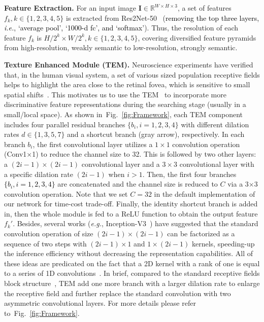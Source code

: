 \documentclass[10pt,journal,compsoc]{IEEEtran}
\def\ie{\emph{i.e.}}
\def\eg{\emph{e.g.}}
\newcommand{\myPara}[1]{\vspace{6pt}\noindent\textbf{#1}\qquad }
\newcommand{\figref}[1]{Fig.~\ref{#1}}
\newcommand{\Rev}[1]{\textcolor{black}{#1}}
\begin{document}
\myPara{Feature Extraction.}
%
For an input image $\mathbf{I}\!\in\!\mathbb{R}^{W\!\times\! H \!\times\!3}$, 
a set of features $f_k, k \in \{ 1,2,3,4,5 \}$ is extracted from 
Res2Net-50~\cite{gao2019res2net} (\Rev{removing the top three layers, \ie, `average pool', `1000-d fc', and `softmax'}).
%
Thus, the resolution of each feature 
$f_k$ is ${H/2^k \times W/2^k}, k \in \{ 1,2,3,4,5 \}$, 
covering diversified feature pyramids from high-resolution, 
weakly semantic to low-resolution, strongly semantic.

\myPara{Texture Enhanced Module (TEM).}
%
Neuroscience experiments have verified that, in the human visual system, 
a set of various sized population receptive fields helps to 
highlight the area close to the retinal fovea, 
which is sensitive to small spatial shifts~\cite{liu2018receptive}.
%
This motivates us to use the TEM~\cite{wu2019cascaded} to incorporate 
more discriminative feature representations during the searching stage 
(usually in a small/local space).
%
As shown in~\figref{fig:Framework}, each TEM component includes four parallel 
residual branches $\{b_i, i = 1,2,3,4\}$ with different dilation rates 
$d \in \{1,3,5,7\}$ and a shortcut branch (gray arrow), respectively.
%
In each branch $b_i$, the first convolutional layer utilizes a $1\times 1$ 
convolution operation (Conv1$\times$1) to reduce the channel size to 32.
%
This is followed by two other layers: 
a $(2i-1)\times(2i-1)$ convolutional layer and a $3\times 3$ 
convolutional layer with a specific dilation rate $(2i-1)$ when $i>1$.
%
Then, the first four branches \Rev{$\{ b_i, i=1, 2, 3, 4 \}$} are concatenated and 
the channel size is reduced to $C$ via a 3$\times$3 convolution operation.
%
Note that we set $C=32$ in the default implementation of our network 
for time-cost trade-off.
%
Finally, the identity shortcut branch is added in, then the whole module 
is fed to a ReLU function to obtain the output feature $f_k'$.
%
Besides, several works (\eg, Inception-V3~\cite{szegedy2016rethinking}) 
have suggested that the standard convolution operation of size 
$(2i-1) \times (2i-1)$ can be factorized as a sequence of two steps with 
$(2i-1) \times 1$ and $1 \times (2i-1)$ kernels, 
speeding-up the inference efficiency without decreasing the 
representation capabilities.
%
All of these ideas are predicated on the fact that a 2D kernel with a rank 
of one is equal to a series of 
1D convolutions~\cite{jaderberg2014speeding,denton2014exploiting}.
%
In brief, compared to the standard receptive fields block structure~\cite{liu2018receptive}, 
TEM add one more branch with a larger dilation rate to enlarge the 
receptive field and further replace the standard convolution 
with two asymmetric convolutional layers.
%
For more details please refer to~\figref{fig:Framework}.
\end{document}
